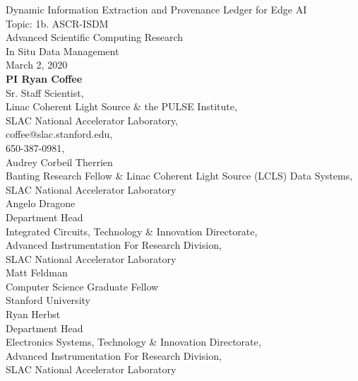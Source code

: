 \documentclass{article}
\begin{document}
\begin{centering}
\large
Dynamic Information Extraction and Provenance Ledger for Edge AI \\
\normalsize
	\vspace{\baselineskip}
	Topic: 1b. ASCR-ISDM\\
	Advanced Scientific Computing Research\\
	In Situ Data Management\\
	\vspace{\baselineskip}
	March 2, 2020\\
	\vspace{2\baselineskip}
	\textbf{PI Ryan Coffee}\\
	Sr. Staff Scientist,\\
	Linac Coherent Light Source \& the PULSE Institute,\\
	SLAC National Accelerator Laboratory, \\coffee@slac.stanford.edu,\\ 650-387-0981, \\
	\vspace{.5\baselineskip}
	Audrey Corbeil Therrien\\Banting Research Fellow \& Linac Coherent Light Source (LCLS) Data Systems,\\
	SLAC National Accelerator Laboratory\\
	\vspace{.5\baselineskip}
	Angelo Dragone\\
	Department Head\\
	Integrated Circuits, Technology \& Innovation Directorate,\\
	Advanced Instrumentation For Research Division,\\
	SLAC National Accelerator Laboratory\\
	\vspace{.5\baselineskip}
	Matt Feldman\\
	Computer Science Graduate Fellow\\
	Stanford University\\
	\vspace{.5\baselineskip}
	Ryan Herbst\\
	Department Head\\
	Electronics Systems, Technology \& Innovation Directorate,\\
	Advanced Instrumentation For Research Division,\\
	SLAC National Accelerator Laboratory\\
	\vspace{.5\baselineskip}

\end{centering}
\end{document}
